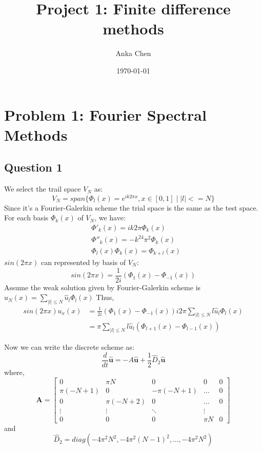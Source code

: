 \documentclass[12pt, fullpage,letterpaper]{article}
\title{Project 1: Finite difference methods}
\author{Anka Chen}
\date{\today}
\begin{document}
\maketitle

\section{Problem 1: Fourier Spectral Methods}
\subsection{Question 1}
We select the trail space $V_N$ as: 
\begin{equation}
    V_N=span\{\Phi_l(x)=e^{i k 2 \pi x},  x \in[0,1] \mid |l| <= N\}
\end{equation}
Since it's a Fourier-Galerkin scheme the trial space is the same as the test space.
For each basis $ \Phi_k(x)$ of $V_N$, we have:
\begin{align}
    & \Phi'_k(x) =  ik2\pi \Phi_k(x) \\
    & \Phi''_k(x) =  -k^24\pi^2 \Phi_k(x) \\ 
    & \Phi_l(x)\Phi_k(x) = \Phi_{k+l}(x)
\end{align}
$sin(2\pi x)$ can represented by basis of $V_N$:
\begin{equation}
    sin(2\pi x) = \frac{1}{2i} (\Phi_1(x) - \Phi_{-1}(x))
\end{equation}
Assume the weak solution given by Fourier-Galerkin scheme is $u_N(x) = \sum_{|l| \leq N} \hat{u}_l \Phi_l(x)$
Thus, 
\begin{align}
    sin(2\pi x) u_x(x) & = \frac{1}{2i} (\Phi_1(x) - \Phi_{-1}(x)) i2\pi \sum_{|l| \leq N} l \hat{u}_l  \Phi_l(x) \\
    &= \pi \sum_{|l| \leq N} l \hat{u}_l  (\Phi_{l+1}(x) - \Phi_{l-1}(x))
\end{align}

Now we can write the discrete scheme as:
\begin{equation}
    \frac{d}{dt} \hat{\mathbf{u}} = - A\hat{\mathbf{u}} + \frac{1}{2} \hat{D}_2 \hat{\mathbf{u}}
\end{equation}
where,
\begin{equation}
\mathbf{A}=
\begin{bmatrix}
0 & \pi N &0 & 0 & 0 \\
\pi  (-N+1) & 0 & -\pi (-N+1) &\hdots & 0 \\
0 & \pi (-N+2) &0  &\hdots & 0 \\

\vdots &  \vdots  & \ddots & \vdots \\
0 & 0 & 0 & \pi N & 0
\end{bmatrix} 
\end{equation}
and
\begin{equation}
    \hat{D}_2 = diag(-4\pi^2N^2, -4\pi^2(N-1)^2, \dots,  -4\pi^2 N^2)
\end{equation}
\end{document}
